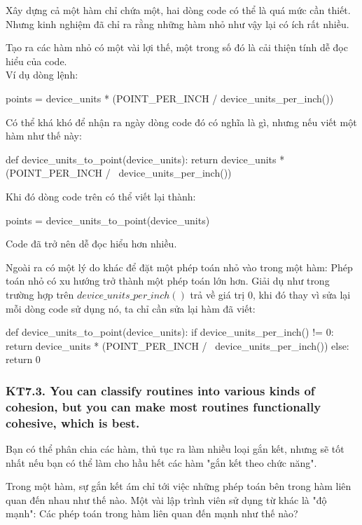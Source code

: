 \documentclass[12pt]{report}
\begin{document}
\noindent Xây dựng cả một hàm chỉ chứa một, hai dòng code có thể là quá mức cần thiết. Nhưng kinh nghiệm đã chỉ ra rằng những hàm nhỏ như vậy lại có ích rất nhiều. 

Tạo ra các hàm nhỏ có một vài lợi thế, một trong số đó là cải thiện tính dễ đọc hiểu của code.\\
Ví dụ dòng lệnh:
\begin{python}
points = device_units * (POINT_PER_INCH / device_units_per_inch())
\end{python} 
Có thể khá khó để nhận ra ngày dòng code đó có nghĩa là gì, nhưng nếu viết một hàm như thế này:
\begin{python}
def device_units_to_point(device_units):
	return device_units * (POINT_PER_INCH /  	\
				device_units_per_inch())
\end{python}
Khi đó dòng code trên có thể viết lại thành:
\begin{python}
points = device_units_to_point(device_units)
\end{python}
Code đã trở nên dễ đọc hiểu hơn nhiều. 

Ngoài ra có một lý do khác để đặt một phép toán nhỏ vào trong một hàm: Phép toán nhỏ có xu hướng trở thành một phép toán lớn hơn. 
Giải dụ như trong trường hợp trên $device\_units\_per\_inch()$ trả về giá trị 0, khi đó thay vì sửa lại mỗi dòng code sử dụng nó, ta chỉ cần sửa lại hàm đã viết:
\begin{python}
def device_units_to_point(device_units):
	if device_units_per_inch() != 0:
		return device_units * (POINT_PER_INCH / 	\
					device_units_per_inch())
	else:
		return 0
\end{python}


\subsubsection{KT7.3. You can classify routines into various kinds of cohesion, but you can make most routines functionally cohesive, which is best.}
Bạn có thể phân chia các hàm, thủ tục ra làm nhiều loại gắn kết, nhưng sẽ tốt nhất nếu bạn có thể làm cho hầu hết các hàm "gắn kết theo chức năng".
\vspace*{3mm}

Trong một hàm, sự gắn kết ám chỉ tới việc những phép toán bên trong hàm liên quan đến nhau như thế nào. Một vài lập trình viên sử dụng từ khác là "độ mạnh": Các phép toán trong hàm liên quan đến mạnh như thế nào? 
\end{document}

